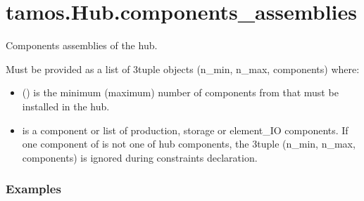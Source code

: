 \documentclass[letterpaper,10pt,english]{sphinxmanual}
\begin{document}
\sphinxstepscope


\section{tamos.Hub.components\_assemblies}
\label{\detokenize{generated/tamos.Hub.components_assemblies:tamos-hub-components-assemblies}}\label{\detokenize{generated/tamos.Hub.components_assemblies::doc}}

\begin{fulllineitems}
\label{\detokenize{generated/tamos.Hub.components_assemblies:tamos.Hub.components_assemblies}}
\pysigstartsignatures
{}
\pysigstopsignatures
\sphinxAtStartPar
Components assemblies of the hub.

\sphinxAtStartPar
Must be provided as a list of 3\sphinxhyphen{}tuple objects (n\_min, n\_max, components) where:
\begin{itemize}
\item {} 
\sphinxAtStartPar
{} () is the minimum (maximum) number of components from  that must be installed in the hub.

\item {} 
\sphinxAtStartPar
{} is a component or list of production, storage or element\_IO components. If one component of  is not one of hub components,
the 3\sphinxhyphen{}tuple (n\_min, n\_max, components) is ignored during constraints declaration.

\end{itemize}
\subsubsection*{Examples}

\begin{sphinxVerbatim}[commandchars=\\\{\}]
  \PYG{p}{[}  \PYG{p}{[} \PYG{p}{]}      \PYG{p}{[} \PYG{p}{]}\PYG{p}{]}
\end{sphinxVerbatim}


\end{fulllineitems}
\end{document}
